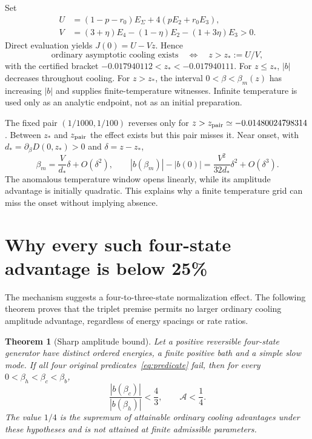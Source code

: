 \documentclass[11pt]{article}
\newtheorem{theorem}{Theorem}
\begin{document}
Set
\begin{align}
 U&=(1-p-r_0)E_\Sigma+4(pE_2+r_0E_3),\nonumber\\
 V&=(3+\eta)E_4-(1-\eta)E_2-(1+3\eta)E_3>0.
\end{align}
Direct evaluation yields $J(0)=U-Vz$. Hence
\begin{equation}\label{eq:onset}
 \text{ordinary asymptotic cooling exists}\quad\Longleftrightarrow\quad
 z>z_*:=U/V,
\end{equation}
with the certified bracket $-0.017940112<z_*<-0.017940111$.
For $z\leq z_*$, $|b|$ decreases throughout cooling. For $z>z_*$,
the interval $0<\beta<\beta_m(z)$ has increasing $|b|$ and supplies
finite-temperature witnesses. Infinite temperature is used only as an
analytic endpoint, not as an initial preparation.

The fixed pair $(1/1000,1/100)$ reverses only for
$z>z_{\rm pair}\simeq-0.01480024798314$. Between $z_*$ and
$z_{\rm pair}$ the effect exists but this pair misses it. Near onset,
with $d_*=\partial_\beta D(0,z_*)>0$ and $\delta=z-z_*$,
\[
 \beta_m=\frac{V}{d_*}\delta+O(\delta^2),\qquad
 |b(\beta_m)|-|b(0)|=\frac{V^2}{32d_*}\delta^2+O(\delta^3).
\]
The anomalous temperature window opens linearly, while its amplitude
advantage is initially quadratic. This explains why a finite temperature
grid can miss the onset without implying absence.

\section{Why every such four-state advantage is below 25\%}\label{sec:bound}
The mechanism suggests a four-to-three-state normalization effect.
The following theorem proves that the triplet premise permits no larger
ordinary cooling amplitude advantage, regardless of energy spacings or
rate ratios.

\begin{theorem}[Sharp amplitude bound]\label{thm:bound}
Let a positive reversible four-state generator have distinct ordered
energies, a finite positive bath and a simple slow mode. If all four
original predicates~\eqref{eq:predicate} fail, then for every
$0<\beta_h<\beta_c<\beta_b$,
\begin{equation}\label{eq:bound}
 \frac{|b(\beta_c)|}{|b(\beta_h)|}<\frac43,
 \qquad \mathcal A<\frac14.
\end{equation}
The value $1/4$ is the supremum of attainable ordinary cooling advantages
under these hypotheses and is not attained at finite admissible parameters.
\end{theorem}
\end{document}
